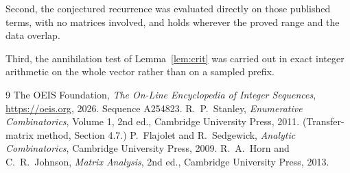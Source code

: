 \documentclass[11pt,a4paper]{article}
\theoremstyle{plain}
\theoremstyle{definition}
\begin{document}
Second, the conjectured recurrence was evaluated directly on those published terms, with no
matrices involved, and holds wherever the proved range and the data overlap.

Third, the annihilation test of Lemma~\ref{lem:crit} was carried out in exact integer
arithmetic on the whole vector rather than on a sampled prefix.

\begin{thebibliography}{9}
 The OEIS Foundation, \emph{The On-Line Encyclopedia of Integer
Sequences}, \url{https://oeis.org}, 2026. Sequence A254823.
 R.~P.~Stanley, \emph{Enumerative Combinatorics}, Volume 1, 2nd ed.,
Cambridge University Press, 2011. (Transfer-matrix method, Section 4.7.)
 P.~Flajolet and R.~Sedgewick, \emph{Analytic Combinatorics}, Cambridge
University Press, 2009.
 R.~A.~Horn and C.~R.~Johnson, \emph{Matrix Analysis}, 2nd ed., Cambridge
University Press, 2013.
\end{thebibliography}
\end{document}
